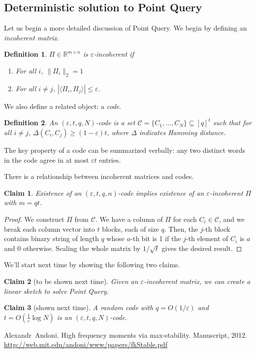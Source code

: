 \documentclass[11pt]{article}
\newtheorem{definition}{Definition}
\newtheorem{claim}{Claim}
\newcommand{\eps}{\varepsilon}
\begin{document}
\subsection{Deterministic solution to Point Query}
Let us begin a more detailed discussion of Point Query. We begin by defining an {\em incoherent matrix}.
\begin{definition}
$\Pi \in \mathbb{R}^{m\times n}$ is {\em $\eps$-incoherent} if
\begin{enumerate}
\item For all $i$, $\| \Pi_i \|_2 = 1$
\item For all $i \neq j$, $| \langle \Pi_i, \Pi_j \rangle | \leq \eps$.
\end{enumerate}
\end{definition}

We also define a related object: a {\em code}.
\begin{definition}
An $(\eps, t, q, N)$-code is a set $\mathcal{C} = \{C_1, \ldots, C_N\} \subseteq [q]^t$ such that for all $i \neq j$, $\Delta(C_i, C_j) \geq (1-\eps)t$, where $\Delta$ indicates Hamming distance.
\end{definition}
The key property of a code can be summarized verbally: any two distinct words in the code agree in at most $\eps t$ entries.

There is a relationship between incoherent matrices and codes.
\begin{claim}
Existence of an $(\eps, t, q, n)$-code implies existence of an $\eps$-incoherent $\Pi$ with $m = qt$.
\end{claim}
\begin{proof}
We construct $\Pi$ from $\mathcal{C}$. We have a column of $\Pi$ for each $C_i \in \mathcal{C}$, and we break each column vector into $t$ blocks, each of size $q$. Then, the $j$-th block contains binary string of length $q$ whose $a$-th bit is 1 if the $j$-th element of $C_i$ is $a$ and 0 otherwise. Scaling the whole matrix by $1/\sqrt{t}$ gives the desired result.
\end{proof}

We'll start next time by showing the following two claims.
\begin{claim}[to be shown next time]
Given an $\eps$-incoherent matrix, we can create a linear sketch to solve Point Query.
\end{claim}

\begin{claim}[shown next time]
A random code with $q = O(1/\eps)$ and $t = O(\frac{1}{\eps}\log N)$ is an $(\eps, t, q, N)$-code.
\end{claim}







\begin{thebibliography}{42}
Alexandr~Andoni.
\newblock High frequency moments via max-stability. 
\newblock Manuscript, 2012. \url{http://web.mit.edu/andoni/www/papers/fkStable.pdf}

\end{thebibliography}
\end{document}
